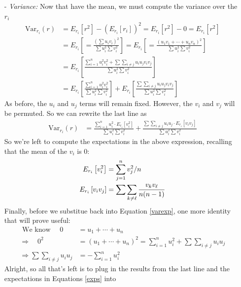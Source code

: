 \documentclass[a4paper,12pt]{scrartcl}
\begin{document}
\begin{itemize}
   \item[-] {\sl Variance:} Now that have the mean, we must compute 
     the variance over the $r_i$ 
      \begin{align*}
	 \text{Var}_{r_i}(r) &= E_{r_i}[r^2] - (E_{r_i}[r_i])^2 = 
	 E_{r_i}[r^2] - 0
	 = E_{r_i}[r^2]\\
	 &= E_{r_i} \left[ 
	     = \frac{\left(\sum u_i v_i\right)^2}{\sum u^2_i\sum v^2_i} 
	     \right] = E_{r_i} \left[ 
	     = \frac{\left(u_1 v_1+ \cdots + u_n v_n \right)^2}{
	     \sum u^2_i \sum v^2_i} \right] \\	
	 &=E_{r_i} \left[\frac{\sum_{i=1}^n u^2_i v^2_i + \sum
	       \sum_{i\neq j}
		u_i u_j v_i v_j}{\sum u^2_i \sum v^2_i} \right] \\
	 &=E_{r_i} \left[\frac{\sum_{i=1}^n u^2_i v^2_i}{
	    \sum u^2_i \sum v^2_i} \right] +
	  E_{r_i} \left[\frac{\sum \sum_{i\neq j}
	     u_i u_j v_i v_j}{\sum u^2_i \sum v^2_i} \right] 
      \end{align*}
      As before, the $u_i$ and $u_j$ terms will remain fixed. However,
      the $v_i$ and $v_j$ will be permuted. So we can rewrite the last
      line as 
      \begin{align}
	 \label{varexp}
	 \text{Var}_{r_i}(r) &= \frac{\sum_{i=1}^n u^2_i \cdot E_{r_i} 
	    \left[v^2_i\right]}{
	    \sum u^2_i \sum v^2_i} +
	  \frac{\sum \sum_{i\neq j} u_i u_j\cdot E_{r_i}
	    \left[v_i v_j\right] }{\sum u^2_i \sum v^2_i} 
      \end{align}
      So we're left to compute the expectations in the above expression,
      recalling that the mean of the $v_i$ is 0:
      \begin{align}
	 \label{exps}
	 E_{r_i} \left[v^2_i\right] &= \sum^n_{j=1} v_j^2 /n\notag\\
	 E_{r_i}\left[v_i v_j\right] &= \sum \sum_{k\neq \ell} \frac{
	 v_k v_\ell}{n(n-1)}
      \end{align}
      Finally, before we substitue back into Equation \ref{varexp}, 
      one more identity that will prove useful:
      \begin{align*}
	 \text{ We know } \quad 0 &= u_1 + \cdots + u_n \\
	 \Rightarrow \quad 0^2 &= (u_1 + \cdots + u_n)^2 =
	 \sum_{i=1}^n u_i^2 + \sum \sum_{i\neq j} u_i u_j\\
	 \Rightarrow \sum \sum_{i\neq j} u_i u_j &=-\sum_{i=1}^n u_i^2
      \end{align*}
      Alright, so all that's left is to plug in the results from
      the last line and the expectations in Equations \ref{exps} into

\end{itemize}
\end{document}
